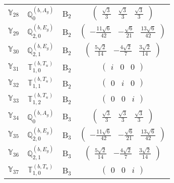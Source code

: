 \documentclass[fleqn,10pt,landscape]{article}
\begin{document}
\begin{itemize}
\begin{center}
\begin{longtable}{c|c|c|c}
$ \mathbb{Y}_{28} $ & $\mathbb{Q}_{0}^{(b,A_{g})}$ & B$_{2}$ & $\begin{pmatrix} \frac{\sqrt{3}}{3} & \frac{\sqrt{3}}{3} & \frac{\sqrt{3}}{3} \end{pmatrix}$ \\
$ \mathbb{Y}_{29} $ & $\mathbb{Q}_{2,0}^{(b,E_{g})}$ & B$_{2}$ & $\begin{pmatrix} - \frac{11 \sqrt{6}}{42} & - \frac{\sqrt{6}}{21} & \frac{13 \sqrt{6}}{42} \end{pmatrix}$ \\
$ \mathbb{Y}_{30} $ & $\mathbb{Q}_{2,1}^{(b,E_{g})}$ & B$_{2}$ & $\begin{pmatrix} \frac{5 \sqrt{2}}{14} & - \frac{4 \sqrt{2}}{7} & \frac{3 \sqrt{2}}{14} \end{pmatrix}$ \\
$ \mathbb{Y}_{31} $ & $\mathbb{T}_{1,0}^{(b,T_{u})}$ & B$_{2}$ & $\begin{pmatrix} i & 0 & 0 \end{pmatrix}$ \\
$ \mathbb{Y}_{32} $ & $\mathbb{T}_{1,1}^{(b,T_{u})}$ & B$_{2}$ & $\begin{pmatrix} 0 & i & 0 \end{pmatrix}$ \\
$ \mathbb{Y}_{33} $ & $\mathbb{T}_{1,2}^{(b,T_{u})}$ & B$_{2}$ & $\begin{pmatrix} 0 & 0 & i \end{pmatrix}$ \\ \hline
$ \mathbb{Y}_{34} $ & $\mathbb{Q}_{0}^{(b,A_{g})}$ & B$_{3}$ & $\begin{pmatrix} \frac{\sqrt{3}}{3} & \frac{\sqrt{3}}{3} & \frac{\sqrt{3}}{3} \end{pmatrix}$ \\
$ \mathbb{Y}_{35} $ & $\mathbb{Q}_{2,0}^{(b,E_{g})}$ & B$_{3}$ & $\begin{pmatrix} - \frac{11 \sqrt{6}}{42} & - \frac{\sqrt{6}}{21} & \frac{13 \sqrt{6}}{42} \end{pmatrix}$ \\
$ \mathbb{Y}_{36} $ & $\mathbb{Q}_{2,1}^{(b,E_{g})}$ & B$_{3}$ & $\begin{pmatrix} \frac{5 \sqrt{2}}{14} & - \frac{4 \sqrt{2}}{7} & \frac{3 \sqrt{2}}{14} \end{pmatrix}$ \\
$ \mathbb{Y}_{37} $ & $\mathbb{T}_{1,0}^{(b,T_{u})}$ & B$_{3}$ & $\begin{pmatrix} 0 & 0 & i \end{pmatrix}$ \\

\end{longtable}
\end{center}
\end{itemize}
\end{document}
